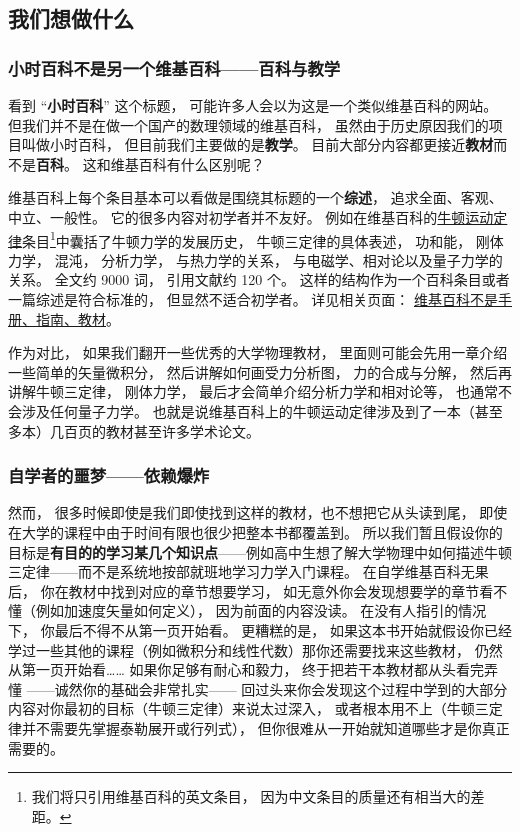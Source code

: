 
\subsection{我们想做什么}
\subsubsection{小时百科不是另一个维基百科——百科与教学}
看到 “\textbf{小时百科}” 这个标题， 可能许多人会以为这是一个类似维基百科的网站。 但我们并不是在做一个国产的数理领域的维基百科， 虽然由于历史原因我们的项目叫做小时百科， 但目前我们主要做的是\textbf{教学}。 目前大部分内容都更接近\textbf{教材}而不是\textbf{百科}。 这和维基百科有什么区别呢？

维基百科上每个条目基本可以看做是围绕其标题的一个\textbf{综述}， 追求全面、客观、中立、一般性。 它的很多内容对初学者并不友好。 例如在维基百科的\href{https://en.wikipedia.org/wiki/Newton's_laws_of_motion}{牛顿运动定律}条目\footnote{我们将只引用维基百科的英文条目， 因为中文条目的质量还有相当大的差距。}中囊括了牛顿力学的发展历史， 牛顿三定律的具体表述， 功和能， 刚体力学， 混沌， 分析力学， 与热力学的关系， 与电磁学、相对论以及量子力学的关系。 全文约 9000 词， 引用文献约 120 个。 这样的结构作为一个百科条目或者一篇综述是符合标准的， 但显然不适合初学者。 详见相关页面： \href{https://en.wikipedia.org/wiki/Wikipedia:What_Wikipedia_is_not}{维基百科不是手册、指南、教材}。

作为对比， 如果我们翻开一些优秀的大学物理教材， 里面则可能会先用一章介绍一些简单的矢量微积分， 然后讲解如何画受力分析图， 力的合成与分解， 然后再讲解牛顿三定律， 刚体力学， 最后才会简单介绍分析力学和相对论等， 也通常不会涉及任何量子力学。 也就是说维基百科上的牛顿运动定律涉及到了一本（甚至多本）几百页的教材甚至许多学术论文。

\subsubsection{自学者的噩梦——依赖爆炸}
然而， 很多时候即使是我们即使找到这样的教材，也不想把它从头读到尾， 即使在大学的课程中由于时间有限也很少把整本书都覆盖到。 所以我们暂且假设你的目标是\textbf{有目的的学习某几个知识点}——例如高中生想了解大学物理中如何描述牛顿三定律——而不是系统地按部就班地学习力学入门课程。 在自学维基百科无果后， 你在教材中找到对应的章节想要学习， 如无意外你会发现想要学的章节看不懂（例如加速度矢量如何定义）， 因为前面的内容没读。 在没有人指引的情况下， 你最后不得不从第一页开始看。 更糟糕的是， 如果这本书开始就假设你已经学过一些其他的课程（例如微积分和线性代数）那你还需要找来这些教材， 仍然从第一页开始看…… 如果你足够有耐心和毅力， 终于把若干本教材都从头看完弄懂 ——诚然你的基础会非常扎实—— 回过头来你会发现这个过程中学到的大部分内容对你最初的目标（牛顿三定律）来说太过深入， 或者根本用不上（牛顿三定律并不需要先掌握泰勒展开或行列式）， 但你很难从一开始就知道哪些才是你真正需要的。

